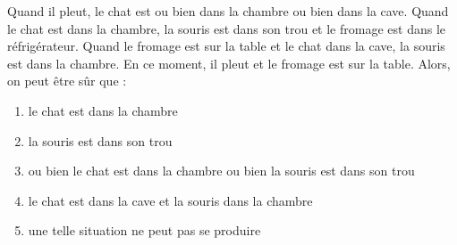 Quand il pleut, le chat est ou bien dans la chambre ou bien dans la cave. Quand le chat est dans la chambre, la souris est dans son trou et le fromage est dans le réfrigérateur. Quand le fromage est sur la table et le chat dans la cave, la souris est dans la chambre. En ce moment, il pleut et le fromage est sur la table. Alors, on peut être sûr que :
\begin{multicols}{2}
  \begin{enumerate}[A/]
  \item le chat est dans la chambre
  \item la souris est dans son trou
  \item ou bien le chat est dans la chambre ou bien la souris est dans son trou
  \item le chat est dans la cave et la souris dans la chambre
  \item une telle situation ne peut pas se produire
  \end{enumerate}
\end{multicols}